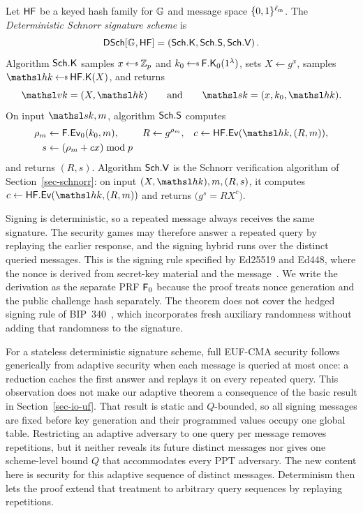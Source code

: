 \begin{construction} \label{constr-derand}
Let $\mathsf{HF}$ be a keyed hash family for $\mathbb{G}$ and message space $\{0,1\}^{\ell_{\mathrm{m}}}$. The \emph{Deterministic Schnorr signature scheme} is
$$
\mathsf{DSch}[\mathbb{G},\mathsf{HF}] = (\mathsf{Sch}.\mathsf{K},\mathsf{Sch}.\mathsf{S},\mathsf{Sch}.\mathsf{V}) \, .
$$
Algorithm $\mathsf{Sch}.\mathsf{K}$ samples $x\getsr\Zp$ and $k_0\getsr\PRFKg_0(\usecp)$, sets $X\gets g^x$, samples $\hk\getsr\HFKg(X)$, and returns
$$
\vkey=(X,\hk)
\qquad\text{and}\qquad
\skey=(x,k_0,\hk).
$$
On input $\skey,m$, algorithm $\mathsf{Sch}.\mathsf{S}$ computes
$$
\begin{aligned}
\rho_m &\gets \PRFEv_0(k_0,m),
& R &\gets g^{\rho_m},
& c &\gets \HFEv(\hk,(R,m)),\\
s &\gets (\rho_m+cx)\bmod p
\end{aligned}
$$
and returns $(R,s)$. Algorithm $\mathsf{Sch}.\mathsf{V}$ is the Schnorr verification algorithm of Section~\ref{sec-schnorr}: on input $(X,\hk),m,(R,s)$, it computes $c\gets\HFEv(\hk,(R,m))$ and returns $\bigl(g^s=RX^c\bigr)$.
\end{construction}

Signing is deterministic, so a repeated message always receives the same signature. The security games may therefore answer a repeated query by replaying the earlier response, and the signing hybrid runs over the distinct queried messages. This is the signing rule specified by Ed25519 and Ed448, where the nonce is derived from secret-key material and the message~\cite{eddsa,RFC8032}. We write the derivation as the separate PRF $\mathsf{F}_0$ because the proof treats nonce generation and the public challenge hash separately. The theorem does not cover the hedged signing rule of BIP~340~\cite{add:BIP340}, which incorporates fresh auxiliary randomness without adding that randomness to the signature.

For a stateless deterministic signature scheme, full EUF-CMA security follows generically from adaptive security when each message is queried at most once: a reduction caches the first answer and replays it on every repeated query. This observation does not make our adaptive theorem a consequence of the basic result in Section~\ref{sec-io-uf}. That result is static and $Q$-bounded, so all signing messages are fixed before key generation and their programmed values occupy one global table. Restricting an adaptive adversary to one query per message removes repetitions, but it neither reveals its future distinct messages nor gives one scheme-level bound $Q$ that accommodates every PPT adversary. The new content here is security for this adaptive sequence of distinct messages. Determinism then lets the proof extend that treatment to arbitrary query sequences by replaying repetitions.

